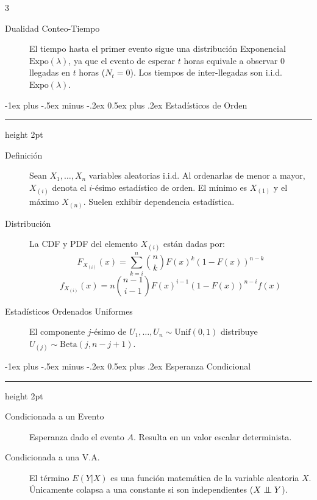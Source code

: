 \documentclass[10pt,landscape]{article}
\makeatletter
\newcommand\independent{\protect\mathpalette{\protect\independenT}{\perp}}
\def\independenT#1#2{\mathrel{\setbox0\hbox{$#1#2$}%
    \copy0\kern-\wd0\mkern4mu\box0}}
\newcommand{\Beta}{\textrm{Beta}}
\newcommand{\Expo}{\textrm{Expo}}
\newcommand{\Unif}{\textrm{Unif}}
\renewcommand{\section}{\@startsection{section}{1}{0mm}%
                                {-1ex plus -.5ex minus -.2ex}%
                                {0.5ex plus .2ex}%
                                {\normalfont\large\bfseries}}
\makeatother
\begin{document}
\begin{multicols*}{3}
\begin{description}
\item[Dualidad Conteo-Tiempo] El tiempo hasta el primer evento sigue una distribución Exponencial $\Expo(\lambda)$, ya que el evento de esperar $t$ horas equivale a observar 0 llegadas en $t$ horas ($N_t = 0$). Los tiempos de inter-llegadas son i.i.d. $\Expo(\lambda)$.
\end{description}


\section{Estadísticos de Orden}\smallskip \hrule height 2pt \smallskip
\begin{description}
    \item[Definición] Sean $X_1, \dots, X_n$ variables aleatorias i.i.d. Al ordenarlas de menor a mayor, $X_{(i)}$ denota el $i$-ésimo estadístico de orden. El mínimo es $X_{(1)}$ y el máximo $X_{(n)}$. Suelen exhibir dependencia estadística.
    \item[Distribución] La CDF y PDF del elemento $X_{(i)}$ están dadas por:
        \[F_{X_{(i)}}(x) = \sum_{k=i}^n \binom{n}{k} F(x)^k(1 - F(x))^{n - k}\]
    \[f_{X_{(i)}}(x) = n\binom{n - 1}{i - 1}F(x)^{i-1}(1 - F(x))^{n-i}f(x)\]
    \item[Estadísticos Ordenados Uniformes] El componente $j$-ésimo de $U_1,\dots,U_n \sim \Unif(0,1)$ distribuye $U_{(j)} \sim \Beta(j, n - j + 1)$.
\end{description}


\section{Esperanza Condicional}\smallskip \hrule height 2pt \smallskip
\begin{description}
    \item[Condicionada a un Evento] Esperanza dado el evento $A$. Resulta en un valor escalar determinista.
\end{description}
        \medskip
\begin{description}
    \item[Condicionada a una V.A.] El término $E(Y|X)$ es una función matemática de la variable aleatoria $X$. Únicamente colapsa a una constante si son independientes ($X \independent Y$).
        

\end{description}
\end{multicols*}
\end{document}
